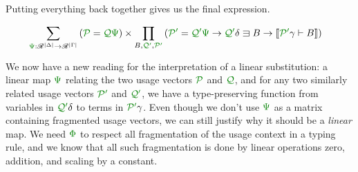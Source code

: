 Putting everything back together gives us the final expression.

\begin{align*}
  &\sum_{\gr\Psi : \Ann^{\size\Delta} \to \Ann^{\size\Gamma}}
    \left(\grP = \grQ\gr\Psi\right) \times
    \prod_{B,\grQprime,\grPprime} \left(
    \grPprime = \grQprime\gr\Psi \to \grQprime\delta \sqni B \to
    \sem{\grPprime\gamma \vdash B}\right)
\end{align*}

We now have a new reading for the interpretation of a linear substitution:
a linear map $\gr\Psi$ relating the two usage vectors $\grP$ and $\grQ$, and
for any two similarly related usage vectors $\grPprime$ and $\grQprime$, we
have a type-preserving function from variables in $\grQprime\delta$ to terms in
$\grPprime\gamma$.
Even though we don't use $\gr\Psi$ as a matrix containing fragmented usage
vectors, we can still justify why it should be a \emph{linear} map.
We need $\gr\Phi$ to respect all fragmentation of the usage context in a typing
rule, and we know that all such fragmentation is done by linear operations
zero, addition, and scaling by a constant.
